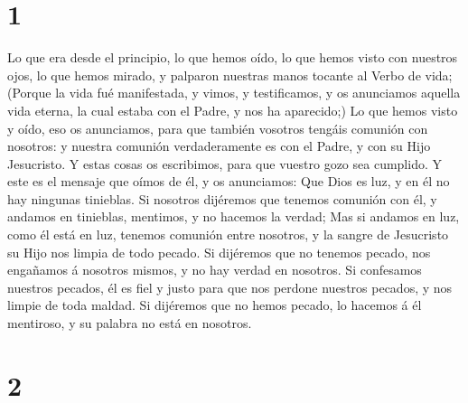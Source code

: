 \hypertarget{section}{%
\section{1}\label{section}}

 Lo que era desde el principio, lo que hemos oído, lo que
hemos visto con nuestros ojos, lo que hemos mirado, y palparon nuestras
manos tocante al Verbo de vida;  (Porque la vida fué
manifestada, y vimos, y testificamos, y os anunciamos aquella vida
eterna, la cual estaba con el Padre, y nos ha aparecido;) 
Lo que hemos visto y oído, eso os anunciamos, para que también vosotros
tengáis comunión con nosotros: y nuestra comunión verdaderamente es con
el Padre, y con su Hijo Jesucristo.  Y estas cosas os
escribimos, para que vuestro gozo sea cumplido.  Y este es
el mensaje que oímos de él, y os anunciamos: Que Dios es luz, y en él no
hay ningunas tinieblas.  Si nosotros dijéremos que tenemos
comunión con él, y andamos en tinieblas, mentimos, y no hacemos la
verdad;  Mas si andamos en luz, como él está en luz,
tenemos comunión entre nosotros, y la sangre de Jesucristo su Hijo nos
limpia de todo pecado.  Si dijéremos que no tenemos
pecado, nos engañamos á nosotros mismos, y no hay verdad en nosotros.
 Si confesamos nuestros pecados, él es fiel y justo para
que nos perdone nuestros pecados, y nos limpie de toda maldad.
 Si dijéremos que no hemos pecado, lo hacemos á él
mentiroso, y su palabra no está en nosotros.

\hypertarget{section-1}{%
\section{2}\label{section-1}}

